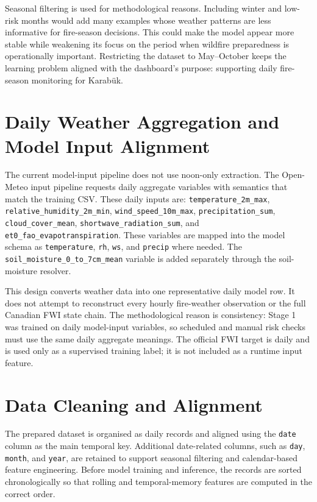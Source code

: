 Seasonal filtering is used for methodological reasons. Including winter and
low-risk months would add many examples whose weather patterns are less
informative for fire-season decisions. This could make the model appear more
stable while weakening its focus on the period when wildfire preparedness is
operationally important. Restricting the dataset to May--October keeps the
learning problem aligned with the dashboard's purpose: supporting daily
fire-season monitoring for Karabük.

\section{Daily Weather Aggregation and Model Input Alignment}

The current model-input pipeline does not use noon-only extraction. The
Open-Meteo input pipeline requests daily aggregate variables with semantics
that match the training CSV. These daily inputs are:
\texttt{temperature\_2m\_max}, \texttt{relative\_humidity\_2m\_min},
\texttt{wind\_speed\_10m\_max}, \texttt{precipitation\_sum},
\texttt{cloud\_cover\_mean}, \texttt{shortwave\_radiation\_sum}, and
\texttt{et0\_fao\_evapotranspiration}. These variables are mapped into the
model schema as \texttt{temperature}, \texttt{rh}, \texttt{ws}, and
\texttt{precip} where needed. The
\texttt{soil\_moisture\_0\_to\_7cm\_mean} variable is added separately through
the soil-moisture resolver.

This design converts weather data into one representative daily model row. It
does not attempt to reconstruct every hourly fire-weather observation or the
full Canadian FWI state chain. The methodological reason is consistency:
Stage 1 was trained on daily model-input variables, so scheduled and manual
risk checks must use the same daily aggregate meanings. The official FWI target
is daily and is used only as a supervised training label; it is not included as
a runtime input feature.

\section{Data Cleaning and Alignment}

The prepared dataset is organised as daily records and aligned using the
\texttt{date} column as the main temporal key. Additional date-related columns,
such as \texttt{day}, \texttt{month}, and \texttt{year}, are retained to
support seasonal filtering and calendar-based feature engineering. Before model
training and inference, the records are sorted chronologically so that rolling
and temporal-memory features are computed in the correct order.

